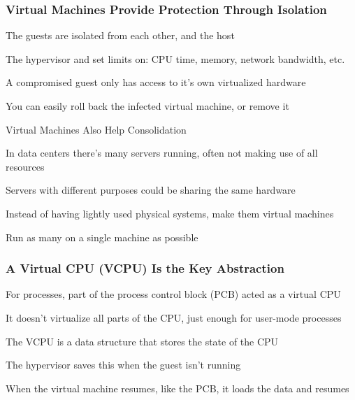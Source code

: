  \begin{frame}
    \frametitle{Virtual Machines Provide Protection Through Isolation}

    The guests are isolated from each other, and the host

    \vspace{2em}

    The hypervisor and set limits on: CPU time, memory, network bandwidth, etc.

    \hspace{2em} A compromised guest only has access to it's own virtualized
                 hardware

    \vspace{2em}

    You can easily roll back the infected virtual machine, or remove it
  \end{frame}

  \begin{frame}{Virtual Machines Also Help Consolidation}

    In data centers there's many servers running, often not making use of all
    resources

    \hspace{2em} Servers with different purposes could be sharing the same
                 hardware

    \vspace{2em}

    Instead of having lightly used physical systems, make them virtual machines

    \hspace{2em} Run as many on a single machine as possible
  \end{frame}

  \begin{frame}
    \frametitle{A Virtual CPU (VCPU) Is the Key Abstraction}

    For processes, part of the process control block (PCB) acted as a virtual
    CPU

    \hspace{2em} It doesn't virtualize all parts of the CPU, just enough for
                 user-mode processes

    \vspace{2em}

    The VCPU is a data structure that stores the state of the CPU

    \hspace{2em} The hypervisor saves this when the guest isn't running

    \vspace{2em}

    When the virtual machine resumes, like the PCB, it loads the data and
    resumes
  \end{frame}

